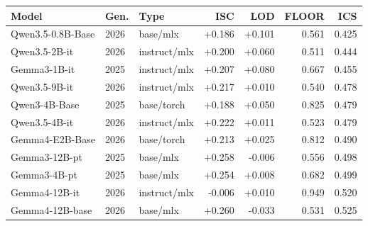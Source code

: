 \begin{tabular}{lllrrrr}
\toprule
Model & Gen. & Type & ISC & LOD & FLOOR & ICS \\
\midrule
Qwen3.5-0.8B-Base & 2026 & base/mlx & +0.186 & +0.101 & 0.561 & 0.425 \\
Qwen3.5-2B-it & 2026 & instruct/mlx & +0.200 & +0.060 & 0.511 & 0.444 \\
Gemma3-1B-it & 2025 & instruct/mlx & +0.207 & +0.080 & 0.667 & 0.455 \\
Qwen3.5-9B-it & 2026 & instruct/mlx & +0.217 & +0.010 & 0.540 & 0.478 \\
Qwen3-4B-Base & 2025 & base/torch & +0.188 & +0.050 & 0.825 & 0.479 \\
Qwen3.5-4B-it & 2026 & instruct/mlx & +0.222 & +0.011 & 0.523 & 0.479 \\
Gemma4-E2B-Base & 2026 & base/torch & +0.213 & +0.025 & 0.812 & 0.490 \\
Gemma3-12B-pt & 2025 & base/mlx & +0.258 & -0.006 & 0.556 & 0.498 \\
Gemma3-4B-pt & 2025 & base/mlx & +0.254 & +0.008 & 0.682 & 0.499 \\
Gemma4-12B-it & 2026 & instruct/mlx & -0.006 & +0.010 & 0.949 & 0.520 \\
Gemma4-12B-base & 2026 & base/mlx & +0.260 & -0.033 & 0.531 & 0.525 \\
\bottomrule
\end{tabular}